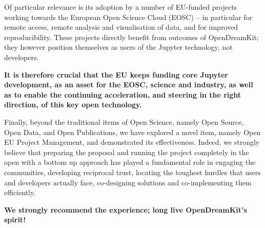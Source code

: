 Of particular relevance is its adoption by a number of EU-funded projects working towards the European Open Science Cloud (EOSC) -- in particular for remote access, remote analysis and visualisation of data, and for improved reproducibility. These projects directly benefit from outcomes of OpenDreamKit; they however position themselves as users of the Jupyter technology, not developers.

\textbf{It is therefore crucial that the EU keeps funding core Jupyter development, as an asset for the EOSC, science and industry, as well as to enable the continuing acceleration, and steering in the right direction, of this key open technology.}

Finally, beyond the traditional items of Open Science, namely Open Source, Open Data, and Open Publications, we have explored a novel item, namely Open EU Project Management, and demonstrated its effectiveness. Indeed, we strongly believe that preparing the proposal and running the project completely in the open with a bottom up approach has played a fundamental role in engaging the communities, developing reciprocal trust, locating the toughest hurdles that users and developers actually face, co-designing solutions and co-implementing them efficiently. 

\textbf{We strongly recommend the experience; long live OpenDreamKit's spirit!}
